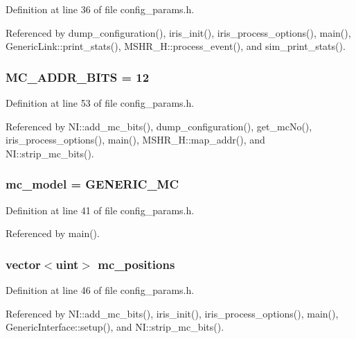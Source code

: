 Definition at line 36 of file config\_\-params.h.

Referenced by dump\_\-configuration(), iris\_\-init(), iris\_\-process\_\-options(), main(), GenericLink::print\_\-stats(), MSHR\_\-H::process\_\-event(), and sim\_\-print\_\-stats().
\subsubsection[{MC\_\-ADDR\_\-BITS}]{ {\bf MC\_\-ADDR\_\-BITS} = 12}\label{config__params_8h_5ef66c602b93d3db97dac0d557e7c84b}




Definition at line 53 of file config\_\-params.h.

Referenced by NI::add\_\-mc\_\-bits(), dump\_\-configuration(), get\_\-mcNo(), iris\_\-process\_\-options(), main(), MSHR\_\-H::map\_\-addr(), and NI::strip\_\-mc\_\-bits().
\subsubsection[{mc\_\-model}]{ {\bf mc\_\-model} = GENERIC\_\-MC}\label{config__params_8h_55b4ff2190b32b7d092f052f8ead5d28}




Definition at line 41 of file config\_\-params.h.

Referenced by main().
\subsubsection[{mc\_\-positions}]{\setlength{\rightskip}{0pt plus 5cm}vector$<${\bf uint}$>$ {\bf mc\_\-positions}}\label{config__params_8h_f58ebe62f79b2e470f0cb7da0f7a7ea5}




Definition at line 46 of file config\_\-params.h.

Referenced by NI::add\_\-mc\_\-bits(), iris\_\-init(), iris\_\-process\_\-options(), main(), GenericInterface::setup(), and NI::strip\_\-mc\_\-bits().
